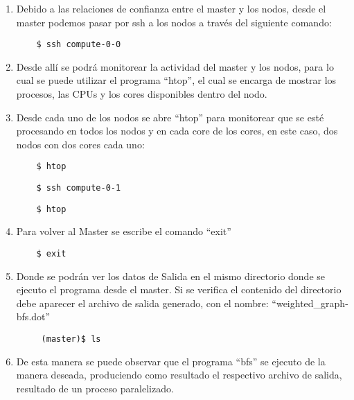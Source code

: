 \begin{enumerate}
	\item Debido a las relaciones de confianza entre el master y los nodos, desde el master podemos pasar por ssh a los nodos a través del siguiente comando: 

	\begin{verbatim}
	$ ssh compute-0-0
	\end{verbatim}


	\item Desde allí se podrá monitorear la actividad del master y los nodos, para lo cual se puede utilizar el programa ``htop'', el cual se encarga de mostrar los procesos, las CPUs y los cores disponibles dentro del nodo. 

	\item  Desde cada uno de los nodos se abre ``htop'' para monitorear que se esté procesando en todos los nodos y en cada core de los cores, en este caso, dos nodos con dos cores cada uno:   


	\begin{verbatim}
	$ htop
	\end{verbatim}

	\begin{verbatim}
	$ ssh compute-0-1
	\end{verbatim}

	\begin{verbatim}
	$ htop
	\end{verbatim}




	\item Para volver al Master se escribe el comando ``exit''


	\begin{verbatim}
	$ exit
	\end{verbatim}

	\item Donde se podrán ver los datos de Salida en el mismo directorio donde se ejecuto el programa desde el master. Si  se verifica el contenido del directorio debe aparecer el archivo de salida generado, con el nombre: ``weighted\_graph-bfs.dot''

	 \begin{verbatim}
	 (master)$ ls 
	 \end{verbatim}


	 

	\item De esta manera se puede observar que el programa ``bfs'' se ejecuto de la manera deseada, produciendo como resultado el respectivo archivo de salida, resultado de un proceso paralelizado.


\end{enumerate}
 
